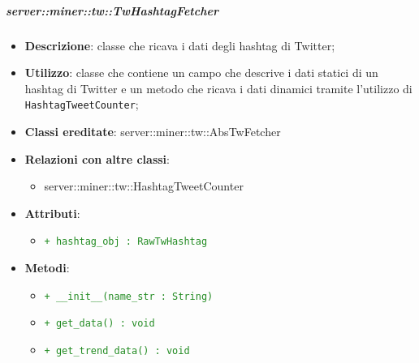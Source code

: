 	\subparagraph{server::miner::tw::TwHashtagFetcher} %
		\label{subp:server_miner_tw_TwHashtagFetcher}
			\begin{itemize}
				\item \textbf{Descrizione}: classe che ricava i dati degli hashtag di Twitter;
				\item \textbf{Utilizzo}: classe che contiene un campo che descrive i dati statici di un hashtag di Twitter e un metodo che ricava i dati dinamici tramite l'utilizzo di \texttt{HashtagTweetCounter};
				\item \textbf{Classi ereditate}: server::miner::tw::AbsTwFetcher
				\item \textbf{Relazioni con altre classi}:
					\begin{itemize}
						\item server::miner::tw::HashtagTweetCounter
					\end{itemize}
				\item \textbf{Attributi}:    
					\begin{itemize}
						\item \textcolor{forestgreen}{\texttt{+ hashtag\_obj : RawTwHashtag}}
					\end{itemize}
				\item \textbf{Metodi}:  
					\begin{itemize}
						\item \textcolor{forestgreen}{\texttt{+ \_\_init\_\_(name\_str : String)}}
						\item \textcolor{forestgreen}{\texttt{+ get\_data() : void}}
						\item \textcolor{forestgreen}{\texttt{+ get\_trend\_data() : void}}
					\end{itemize}
			\end{itemize}

